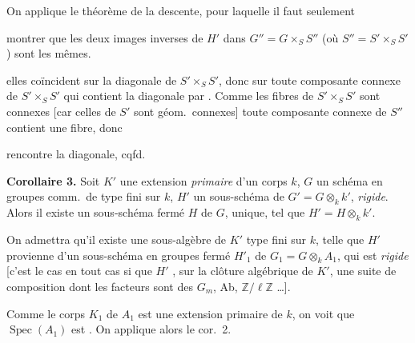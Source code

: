 \documentclass[11pt,a4paper]{article}
\begin{document}
On applique le théorème de la descente, pour laquelle il faut seulement

montrer que les deux images inverses de $H'$ dans $G'' = G \times_S S''$
(où $S'' = S' \times_S S'$) sont les mêmes.
 

\ill{} elles coïncident sur la diagonale de $S' \times_S S'$, donc sur toute
composante connexe de $S' \times_S S'$ qui contient la diagonale par
\ill{}. Comme les fibres de $S' \times_S S'$ sont connexes [car celles de $S'$
sont géom.\ connexes] toute composante connexe de $S''$ contient \ill{} \ill{}
\ill{} une fibre, donc

rencontre la diagonale, cqfd.

\textbf{Corollaire 3.} Soit $K'$ une extension \emph{primaire} d'un corps
$k$, $G$ un schéma en groupes comm.\ de type fini sur $k$, $H'$ un
sous-schéma  de $G' = G \otimes_k k'$, \emph{rigide}.
Alors il existe un sous-schéma  fermé $H$ de $G$, unique,
 tel que $H' = H \otimes_k k'$.

On admettra qu'il existe une sous-algèbre  de $K'$ 
\struck{\ill{}} type fini sur $k$, telle que $H'$ provienne d'un sous-schéma
en groupes fermé $H'_1$ de $G_1 = G \otimes_k A_1$, \struck{\ill{}} qui est
\emph{rigide} [c'est le cas en tout cas si \struck{\ill{}} \ill{} que $H'$
\ill{}, sur la clôture algébrique de $K'$, une suite de composition dont les
facteurs sont des $G_m$, Ab, $\mathbb{Z}/\ell\mathbb{Z}$ …].

 Comme le corps $K_1$ de $A_1$ est une extension
primaire de $k$, on voit que $\operatorname{Spec}(A_1)$ est
 \struck{\ill{}} \ill{}. On applique alors le
cor.~2.
\end{document}
